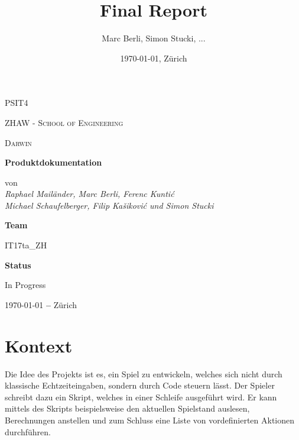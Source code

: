 \documentclass[a4paper, 11pt]{scrartcl}
\title{Final Report}
\author{Marc Berli, Simon Stucki, ...}
\date{\today{}, Zürich}
\let\oldsection\section
\renewcommand\section{\clearpage\oldsection}
\begin{document}
\begin{titlepage}
  \centering
  {\scshape\LARGE PSIT4 \par}
  \vspace{1cm}
  {\scshape ZHAW - School of Engineering\par}
  \vspace{1cm}
  {\scshape\Large Darwin\par}
  \vspace{1.5cm}
  {\huge\bfseries Produktdokumentation\par}
  \vspace{2cm}
  von
  \vspace{1em}
  \Large\itshape \\ Raphael Mailänder, Marc Berli, Ferenc Kuntić \\ Michael Schaufelberger, Filip Kašiković und Simon Stucki\par
  \vfill
  \textbf{Team}\par
  IT17ta\_ZH\par
  \vspace{2em}
  \textbf{Status}\par
  In Progress

  \vfill

  {\large \today \textbf{ --} Zürich\par}
\end{titlepage}

\tableofcontents

\newpage

\section{Kontext}

Die Idee des Projekts ist es, ein Spiel zu entwickeln, welches sich nicht durch klassische Echtzeiteingaben,
sondern durch Code steuern lässt.
Der Spieler schreibt dazu ein Skript, welches in einer Schleife ausgeführt wird.
Er kann mittels des Skripts beispielsweise den aktuellen Spielstand auslesen, Berechnungen anstellen und zum Schluss eine Liste von vordefinierten Aktionen durchführen.
\end{document}
